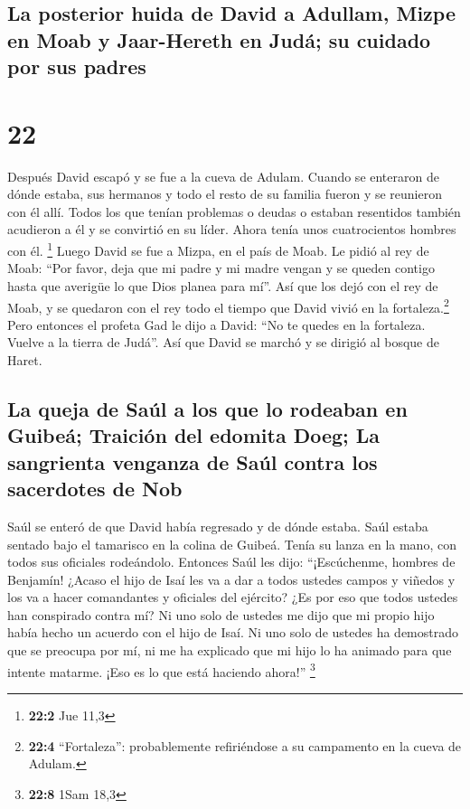 \hypertarget{la-posterior-huida-de-david-a-adullam-mizpe-en-moab-y-jaar-hereth-en-juduxe1-su-cuidado-por-sus-padres}{%
\subsection{La posterior huida de David a Adullam, Mizpe en Moab y
Jaar-Hereth en Judá; su cuidado por sus
padres}\label{la-posterior-huida-de-david-a-adullam-mizpe-en-moab-y-jaar-hereth-en-juduxe1-su-cuidado-por-sus-padres}}

\hypertarget{section-21}{%
\section{22}\label{section-21}}

 Después David escapó y se fue a la cueva de Adulam.
Cuando se enteraron de dónde estaba, sus hermanos y todo el resto de su
familia fueron y se reunieron con él allí.  Todos los que
tenían problemas o deudas o estaban resentidos también acudieron a él y
se convirtió en su líder. Ahora tenía unos cuatrocientos hombres con él.
\footnote{\textbf{22:2} Jue 11,3}  Luego David se fue a
Mizpa, en el país de Moab. Le pidió al rey de Moab: ``Por favor, deja
que mi padre y mi madre vengan y se queden contigo hasta que averigüe lo
que Dios planea para mí''.  Así que los dejó con el rey de
Moab, y se quedaron con el rey todo el tiempo que David vivió en la
fortaleza.\footnote{\textbf{22:4} ``Fortaleza'': probablemente
  refiriéndose a su campamento en la cueva de Adulam.} 
Pero entonces el profeta Gad le dijo a David: ``No te quedes en la
fortaleza. Vuelve a la tierra de Judá''. Así que David se marchó y se
dirigió al bosque de Haret.

\hypertarget{la-queja-de-sauxfal-a-los-que-lo-rodeaban-en-guibeuxe1-traiciuxf3n-del-edomita-doeg-la-sangrienta-venganza-de-sauxfal-contra-los-sacerdotes-de-nob}{%
\subsection{La queja de Saúl a los que lo rodeaban en Guibeá; Traición
del edomita Doeg; La sangrienta venganza de Saúl contra los sacerdotes
de
Nob}\label{la-queja-de-sauxfal-a-los-que-lo-rodeaban-en-guibeuxe1-traiciuxf3n-del-edomita-doeg-la-sangrienta-venganza-de-sauxfal-contra-los-sacerdotes-de-nob}}

 Saúl se enteró de que David había regresado y de dónde
estaba. Saúl estaba sentado bajo el tamarisco en la colina de Guibeá.
Tenía su lanza en la mano, con todos sus oficiales rodeándolo.
 Entonces Saúl les dijo: ``¡Escúchenme, hombres de
Benjamín! ¿Acaso el hijo de Isaí les va a dar a todos ustedes campos y
viñedos y los va a hacer comandantes y oficiales del ejército?
 ¿Es por eso que todos ustedes han conspirado contra mí?
Ni uno solo de ustedes me dijo que mi propio hijo había hecho un acuerdo
con el hijo de Isaí. Ni uno solo de ustedes ha demostrado que se
preocupa por mí, ni me ha explicado que mi hijo lo ha animado para que
intente matarme. ¡Eso es lo que está haciendo ahora!'' \footnote{\textbf{22:8}
  1Sam 18,3}

